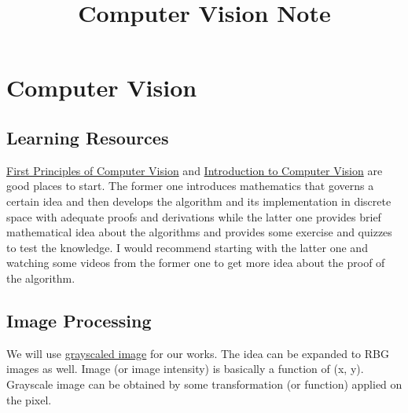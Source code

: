 \documentclass[12pt]{report}%
\title{\Large{Computer Vision Note}}
\author{}
\theoremstyle{definition}  %
\begin{document}
\maketitle
\pagebreak
\selectfont	
\frenchspacing
{}

\tableofcontents
\pagebreak
\chapter{Computer Vision}

\section{Learning Resources}
\hspace{\parindent}\href{https://www.youtube.com/@firstprinciplesofcomputerv3258/playlists}{First Principles of Computer Vision} and \href{https://www.udacity.com/course/introduction-to-computer-vision--ud810?autoenroll=true}{Introduction to Computer Vision} are good places to start. The former one introduces mathematics that governs a certain idea and then develops the algorithm and its implementation in discrete space with adequate proofs and derivations while the latter one provides brief mathematical idea about the algorithms and provides some exercise and quizzes to test the knowledge. I would recommend starting with the latter one and watching some videos from the former one to get more idea about the proof of the algorithm.


\section{Image Processing}
\hspace{\parindent}We will use \href{https://en.wikipedia.org/wiki/Grayscale}{grayscaled image} for our works. The idea can be expanded to RBG images as well. Image (or image intensity) is basically a function of (x, y). Grayscale image can be obtained by some transformation (or function) applied on the pixel.
\end{document}
